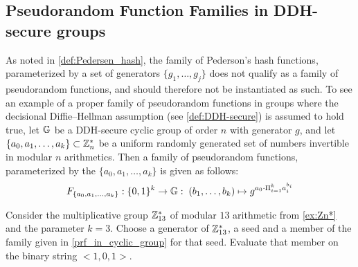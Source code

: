 \subsection{Pseudorandom Function Families in DDH-secure groups}
As noted in \ref{def:Pedersen_hash}, the family of Pederson's hash functions, parameterized by a set of generators $\{g_1,\ldots,g_j\}$ does not qualify as a family of pseudorandom functions, and should therefore not be instantiated as such. To see an example of a proper family of pseudorandom functions in groups where the decisional Diffie--Hellman assumption (see \secname \ref{def:DDH-secure}) is assumed to hold true, let $\mathbb{G}$ be a DDH-secure cyclic group of order $n$ with generator $g$, and let $\{a_0,a_1,\ldots,a_k\}\subset \mathbb{Z}_{n}^*$ be a uniform randomly generated set of numbers invertible in modular $n$ arithmetics. Then a family of pseudorandom functions, parameterized by the  $\{a_0,a_1,\ldots,a_k\}$ is given as follows:
\begin{equation}
\label{prf_in_cyclic_group}
F_{\{a_0,a_1,\ldots,a_k\}}: \{0,1\}^{k} \to \mathbb{G}:\; (b_1,\ldots,b_k)\mapsto g^{a_0\cdot \Pi_{i=1}^k a_i^{b_i}}
\end{equation}
\begin{exercise} Consider the multiplicative group $\mathbb{Z}_{13}^*$ of modular $13$ arithmetic from \examplename{} \ref{ex:Zn*} and the parameter $k=3$. Choose a generator of $\mathbb{Z}_{13}^*$, a seed and  a member of the family given in \eqref{prf_in_cyclic_group} for that seed. Evaluate that member on the binary string $<1,0,1>$.
\end{exercise}



